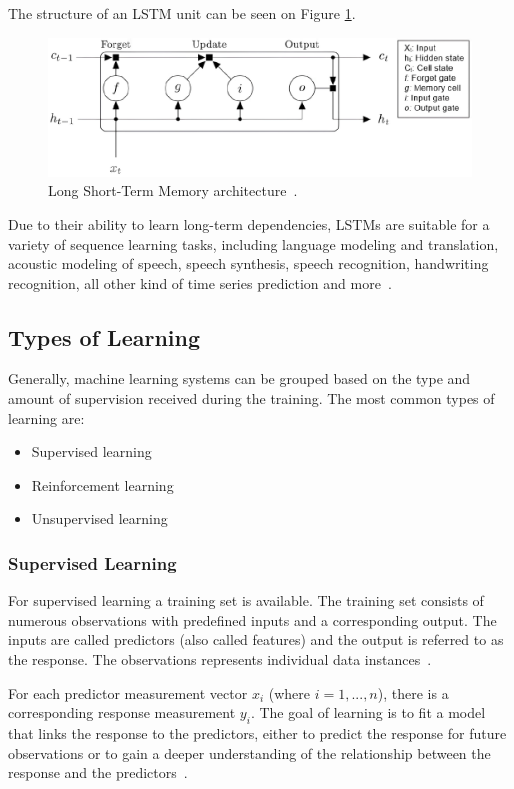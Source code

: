 \documentclass[a4paper,oneside,onecolumn,12pt]{book}
\begin{document}
		The structure of an LSTM unit can be seen on Figure \ref{fig:lstm}.
		\begin{figure}[H]
		\begin{center}
			\includegraphics[keepaspectratio,width=14cm]{kep/lstm.jpg}
			\caption{Long Short-Term Memory architecture~\cite{HLSTMW}.}
			\label{fig:lstm}
		\end{center}
		\end{figure}
		Due to their ability to learn long-term dependencies, LSTMs are suitable for a variety of sequence learning tasks, including language modeling and translation, acoustic modeling of speech, speech synthesis, speech recognition, handwriting recognition, all other kind of time series prediction and more~\cite{LSTM}.

	\subsection{Types of Learning}
	Generally, machine learning systems can be grouped based on the type and amount of supervision received during the training. The most common types of learning are:
	\begin{itemize}
		\item Supervised learning
		\item Reinforcement learning
		\item Unsupervised learning~\cite{HMLSKT}
	\end{itemize}
		
		\subsubsection{Supervised Learning}
		For supervised learning a training set is available. The training set consists of numerous observations with predefined inputs and a corresponding output. The inputs are called predictors (also called features) and the output is referred to as the response. The observations represents individual data instances~\cite{TESL}.

		For each predictor measurement vector $x_i$ (where $i = 1, ..., n$), there is a corresponding response measurement $y_i$. The goal of learning is to fit a model that links the response to the predictors, either to predict the response for future observations or to gain a deeper understanding of the relationship between the response and the predictors~\cite{AISL}.
\end{document}
